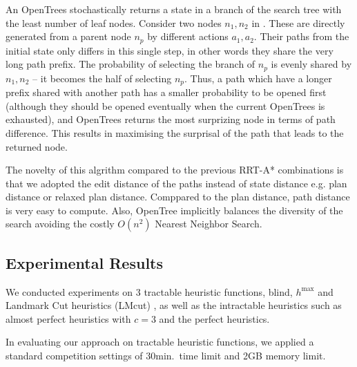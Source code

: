 An OpenTrees stochastically returns a state in a branch of the search tree with the least number of leaf nodes. Consider two nodes $n_1,n_2$ in . These are directly generated from a parent node $n_p$ by different actions $a_1,a_2$. Their paths from the initial state only differs in this single step, in other words they share the very long path prefix. The probability of selecting the branch of $n_p$ is evenly shared by $n_1,n_2$ -- it becomes the half of selecting $n_p$. Thus, a path which have a longer prefix shared with another path has a smaller probability to be opened first (although they should be opened eventually when the current OpenTrees is exhausted), and OpenTrees returns the most surprizing node in terms of path difference.
This results in maximising the surprisal of the path that leads to the returned node.


The novelty of this algrithm compared to the previous RRT-A* combinations is that we adopted the edit distance of the paths instead of state distance e.g. plan distance or relaxed plan distance.
Comppared to the plan distance, path distance is very easy to compute. Also, OpenTree implicitly balances the diversity of the search avoiding the costly $O(n^2)$ Nearest Neighbor Search.

\subsection{Experimental Results}
\label{sec-3}

We conducted experiments on 3 tractable heuristic functions, blind, $h^{\mbox{max}}$ and Landmark Cut heuristics (LMcut) \cite{Helmert2009}, as well as the intractable heuristics such as almost perfect heuristics with $c=3$ and the perfect heuristics.

In evaluating our approach on tractable heuristic functions, we applied a standard competition settings of 30min.\ time limit and 2GB memory limit.

